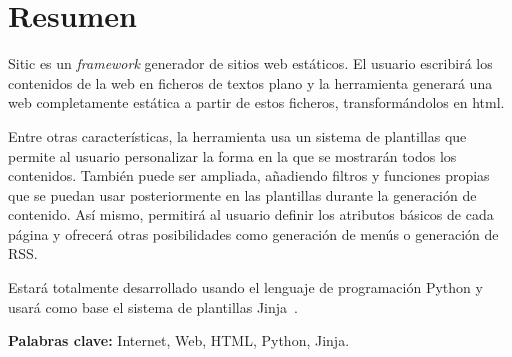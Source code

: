 \section*{Resumen}

Sitic es un \textit{framework} generador de sitios web estáticos. El usuario escribirá
los contenidos de la web en ficheros de textos plano y la
herramienta generará una web completamente estática a partir de estos ficheros,
transformándolos en html.

Entre otras características, la herramienta usa un sistema de plantillas que permite al
usuario personalizar la forma en la que se mostrarán todos los contenidos. También puede
ser ampliada, añadiendo filtros y funciones propias que se puedan usar posteriormente en
las plantillas durante la generación de contenido. Así mismo, permitirá al usuario definir los
atributos básicos de cada página y ofrecerá otras posibilidades como generación de menús
o generación de RSS.

Estará totalmente desarrollado usando el lenguaje de programación Python y usará como
base el sistema de plantillas Jinja~\cite{jinja}.

\textbf{Palabras clave:} Internet, Web, HTML, Python, Jinja.


